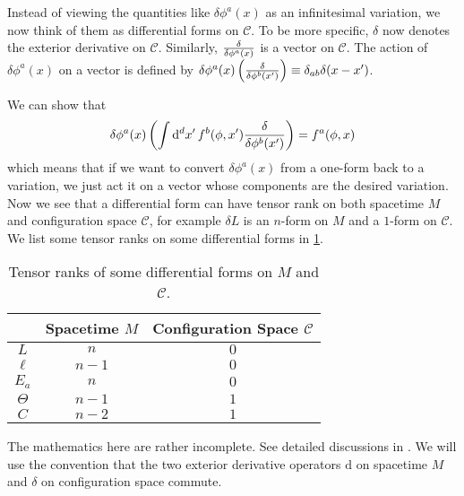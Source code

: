 \documentclass[10pt]{article}
\begin{document}
\begin{intu}
    Instead of viewing the quantities like $\delta\phi^a(x)$ as an infinitesimal variation, we now think of them as differential forms on $\mathcal{C}$.
    To be more specific, $\delta$ now denotes the exterior derivative on $\mathcal{C}$.
    Similarly, $\fdv{\phi^a(x)}$ is a vector on $\mathcal{C}$.
    The action of $\delta\phi^a(x)$ on a vector is defined by $\delta\phi^a(x)\left(\fdv{\phi^b(x')}\right)\equiv\delta_{ab}\delta(x-x')$.
\end{intu}
We can show that
\begin{equation}
    \delta\phi^a(x)\left(\int\dd[d]{x'}f^b(\phi,x')\fdv{\phi^b(x')}\right)=f^a(\phi,x)
\end{equation}
which means that if we want to convert $\delta\phi^a(x)$ from a one-form back to a variation, we just act it on a vector whose components are the desired variation.
Now we see that a differential form can have tensor rank on both spacetime $M$ and configuration space $\mathcal{C}$, for example $\delta L$ is an $n$-form on $M$ and a $1$-form on $\mathcal{C}$.
We list some tensor ranks on some differential forms in \cref{tab:rank}.
\begin{table}[h]
    \centering
    \begin{tabular}{@{}ccc@{}}
        \toprule
                 & Spacetime $M$ & Configuration Space $\mathcal{C}$ \\ \midrule
        $L$      & $n$           & $0$                               \\
        $\ell$   & $n-1$         & $0$                               \\
        $E_a$   & $n$         & $0$                               \\
        $\Theta$ & $n-1$         & $1$                               \\
        $C$      & $n-2$         & $1$                               \\ \bottomrule
    \end{tabular}
    \caption{Tensor ranks of some differential forms on $M$ and $\mathcal{C}$.}
    \label{tab:rank}
\end{table}
\begin{remark}
    The mathematics here are rather incomplete. 
    See detailed discussions in \cite{Crnkovic:1986ex,compere2019advanced}.
    We will use the convention that the two exterior derivative operators $\mathrm{d}$ on spacetime $M$ and $\delta$ on configuration space commute.
\end{remark}
\end{document}
